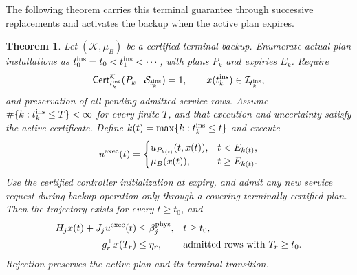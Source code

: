 \documentclass[preprint,12pt]{elsarticle}
\newtheorem{theorem}{Theorem}
\begin{document}
The following theorem carries this terminal guarantee through successive
replacements and activates the backup when the active plan expires.

\begin{theorem}
\label{thm:backup-recursive-availability}
Let $(\mathcal K,\mu_B)$ be a certified terminal backup. Enumerate
actual plan installations as $t_0^{\rm ins}=t_0<t_1^{\rm ins}<\cdots$,
with plans $P_k$ and expiries $E_k$. Require
\[
\mathsf{Cert}^{\mathcal K}_{t_k^{\rm ins}}
 (P_k\mid\mathcal S_{t_k^{\rm ins}})=1,\qquad
x(t_k^{\rm ins})\in\mathcal I_{t_k^{\rm ins}},
\]
and preservation of all pending admitted service rows.
Assume $\#\{k:t_k^{\rm ins}\le T\}<\infty$ for every finite $T$, and
that execution and uncertainty satisfy the active certificate. Define
$k(t)=\max\{k:t_k^{\rm ins}\le t\}$ and execute
\begin{equation}
u^{\rm exec}(t)=\begin{cases}
u_{P_{k(t)}}(t,x(t)),&t<E_{k(t)},\\
\mu_B(x(t)),&t\ge E_{k(t)}.
\end{cases}
\label{eq:terminal-execution-policy}
\end{equation}
Use the certified controller initialization at expiry, and admit any new
service request during backup operation only through a covering terminally
certified plan. Then the trajectory exists for every $t\ge t_0$, and
\begin{equation}
\begin{aligned}
H_jx(t)+J_ju^{\rm exec}(t)&\le\beta_j^{\rm phys},
 &&t\ge t_0,\\
g_r^\top x(T_r)&\le\eta_r,
 &&\text{admitted rows with }T_r\ge t_0.
\end{aligned}
\label{eq:terminal-global-guarantee}
\end{equation}
Rejection preserves the active plan and its terminal transition.
\end{theorem}
\end{document}
